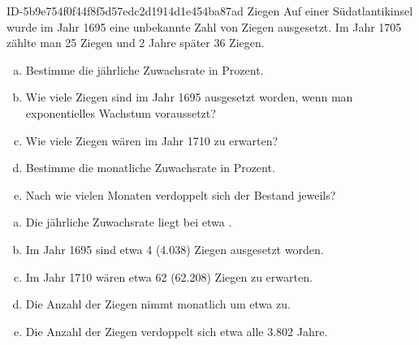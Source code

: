 \begin{exercise}
      {ID-5b9e754f0f44f8f5d57edc2d1914d1e454ba87ad}
      {Ziegen}
  \ifproblem\problem
    Auf einer Südatlantikinsel wurde im Jahr 1695 eine
    unbekannte Zahl von Ziegen ausgesetzt. Im Jahr 1705
    zählte man 25 Ziegen und 2 Jahre später
    36 Ziegen.
    \begin{enumerate}[a)]
      \item Bestimme die jährliche Zuwachsrate in Prozent.
      \item Wie viele Ziegen sind im Jahr 1695 ausgesetzt
            worden, wenn man exponentielles Wachstum voraussetzt?
      \item Wie viele Ziegen wären im Jahr 1710 zu erwarten?
      \item Bestimme die monatliche Zuwachsrate in Prozent.
      \item Nach wie vielen Monaten verdoppelt sich der Bestand
            jeweils?
    \end{enumerate}
  \fi
  \ifoutcome\outcome
    \begin{enumerate}[a)]
      \item Die jährliche Zuwachsrate liegt bei etwa .
      \item Im Jahr 1695 sind etwa 4 (\num{4.038}) Ziegen
            ausgesetzt worden.
      \item Im Jahr 1710 wären etwa 62 (\num{62.208}) Ziegen
            zu erwarten.
      \item Die Anzahl der Ziegen nimmt monatlich um etwa
             zu.
      \item Die Anzahl der Ziegen verdoppelt sich etwa
            alle \num{3.802} Jahre.
    \end{enumerate}
  \fi
\end{exercise}
